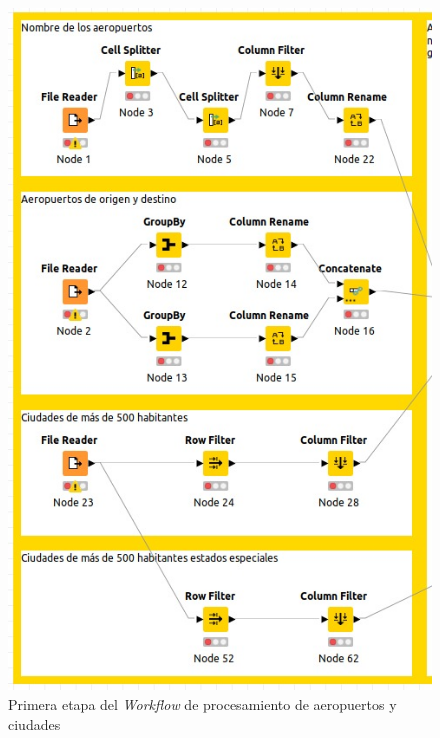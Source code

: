 \documentclass{article}
\begin{document}
\begin{landscape}
\begin{figure}
        \includegraphics[scale=0.5]{images/workflow_ciudades_1.jpeg}
        \caption{Primera etapa del \textit{Workflow} de procesamiento de aeropuertos y ciudades}
        \label{fig:workflow_aeropuertos_ciudades_1}
    \end{figure}
    \newpage
    \begin{figure}
        \centering

\end{figure}
\end{landscape}
\end{document}
